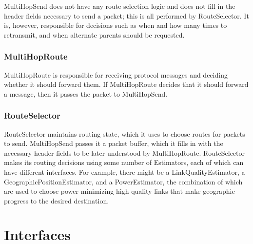 \documentclass[10pt]{article}
\begin{document}
MultiHopSend does not have any route selection logic and does not fill
in the header fields necessary to send a packet; this is all performed
by RouteSelector. It is, however, responsible for decisions such as
when and how many times to retransmit, and when alternate parents
should be requested.

\subsubsection*{MultiHopRoute}

MultiHopRoute is responsible for receiving protocol messages and
deciding whether it should forward them. If MultiHopRoute decides that
it should forward a message, then it passes the packet to MultiHopSend.

\subsubsection*{RouteSelector}

RouteSelector maintains routing state, which it uses to choose routes
for packets to send. MultiHopSend passes it a packet buffer, which it
fills in with the necessary header fields to be later understood by
MultiHopRoute. RouteSelector makes its routing decisions using some
number of Estimators, each of which can have different interfaces. For
example, there might be a LinkQualityEstimator, a
GeographicPositionEstimator, and a PowerEstimator, the combination of
which are used to choose power-minimizing high-quality links that make
geographic progress to the desired destination.


\section*{Interfaces}
\end{document}
